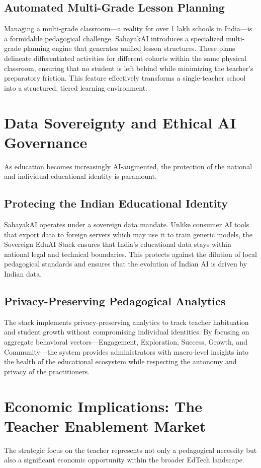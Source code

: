 \documentclass[11pt,a4paper]{article}
\begin{document}
\subsection{Automated Multi-Grade Lesson Planning}
Managing a multi-grade classroom---a reality for over 1 lakh schools in India---is a formidable pedagogical challenge. SahayakAI introduces a specialized multi-grade planning engine that generates unified lesson structures. These plans delineate differentiated activities for different cohorts within the same physical classroom, ensuring that no student is left behind while minimizing the teacher's preparatory friction. This feature effectively transforms a single-teacher school into a structured, tiered learning environment.

\section{Data Sovereignty and Ethical AI Governance}
As education becomes increasingly AI-augmented, the protection of the national and individual educational identity is paramount.

\subsection{Protecing the Indian Educational Identity}
SahayakAI operates under a sovereign data mandate. Unlike consumer AI tools that export data to foreign servers which may use it to train generic models, the Sovereign EduAI Stack ensures that India's educational data stays within national legal and technical boundaries. This protects against the dilution of local pedagogical standards and ensures that the evolution of Indian AI is driven by Indian data.

\subsection{Privacy-Preserving Pedagogical Analytics}
The stack implements privacy-preserving analytics to track teacher habituation and student growth without compromising individual identities. By focusing on aggregate behavioral vectors---Engagement, Exploration, Success, Growth, and Community---the system provides administrators with macro-level insights into the health of the educational ecosystem while respecting the autonomy and privacy of the practitioners.

\section{Economic Implications: The Teacher Enablement Market}
The strategic focus on the teacher represents not only a pedagogical necessity but also a significant economic opportunity within the broader EdTech landscape.
\end{document}
